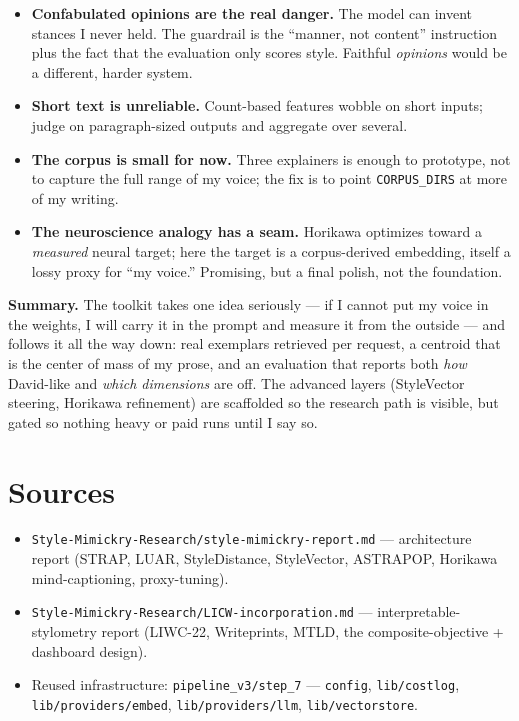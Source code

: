 \documentclass[11pt]{article}
\newcommand{\code}[1]{\texttt{#1}}
\begin{document}
\begin{itemize}[leftmargin=*]
  \item \textbf{Confabulated opinions are the real danger.} The model can invent stances I never
        held. The guardrail is the ``manner, not content'' instruction plus the fact that the
        evaluation only scores style. Faithful \emph{opinions} would be a different, harder system.
  \item \textbf{Short text is unreliable.} Count-based features wobble on short inputs; judge on
        paragraph-sized outputs and aggregate over several.
  \item \textbf{The corpus is small for now.} Three explainers is enough to prototype, not to capture
        the full range of my voice; the fix is to point \code{CORPUS\_DIRS} at more of my writing.
  \item \textbf{The neuroscience analogy has a seam.} Horikawa optimizes toward a \emph{measured}
        neural target; here the target is a corpus-derived embedding, itself a lossy proxy for ``my
        voice.'' Promising, but a final polish, not the foundation.
\end{itemize}

\medskip
\noindent\textbf{Summary.} The toolkit takes one idea seriously --- if I cannot put my voice in the
weights, I will carry it in the prompt and measure it from the outside --- and follows it all the way
down: real exemplars retrieved per request, a centroid that is the center of mass of my prose, and an
evaluation that reports both \emph{how} David-like and \emph{which dimensions} are off. The advanced
layers (StyleVector steering, Horikawa refinement) are scaffolded so the research path is visible,
but gated so nothing heavy or paid runs until I say so.

\section*{Sources}
\begin{itemize}[leftmargin=*]
  \item \code{Style-Mimickry-Research/style-mimickry-report.md} --- architecture report (STRAP,
        LUAR, StyleDistance, StyleVector, ASTRAPOP, Horikawa mind-captioning, proxy-tuning).
  \item \code{Style-Mimickry-Research/LICW-incorporation.md} --- interpretable-stylometry report
        (LIWC-22, Writeprints, MTLD, the composite-objective + dashboard design).
  \item Reused infrastructure: \code{pipeline\_v3/step\_7} --- \code{config},
        \code{lib/costlog}, \code{lib/providers/embed}, \code{lib/providers/llm},
        \code{lib/vectorstore}.
\end{itemize}
\end{document}

